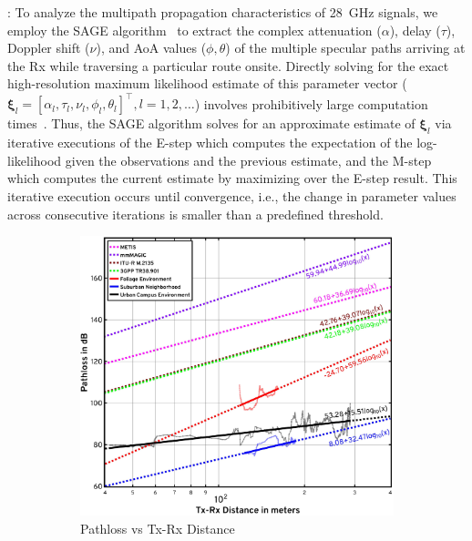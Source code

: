 \documentclass[12pt, draftcls, onecolumn]{IEEEtran}
\begin{document}
{: To analyze the multipath propagation characteristics of \SI{28}{\giga\hertz} signals, we employ the SAGE algorithm~\cite{SAGE} to extract the complex attenuation ($\alpha$), delay ($\tau$), Doppler shift ($\nu$), and AoA values ($\phi,\theta$) of the multiple specular paths arriving at the Rx while traversing a particular route onsite. Directly solving for the exact high-resolution maximum likelihood estimate of this parameter vector ($\boldsymbol{\xi}_{l}{=}[\alpha_{l},\tau_{l},\nu_{l},\phi_{l},\theta_{l}]^{\intercal},l{=}1,2,{\dots}$) involves prohibitively large computation times~\cite{SAGE}. Thus, the SAGE algorithm solves for an approximate estimate of $\boldsymbol{\xi}_{l}$ via iterative executions of the E-step which computes the expectation of the log-likelihood given the observations and the previous estimate, and the M-step which computes the current estimate by maximizing over the E-step result. This iterative execution occurs until convergence, i.e., the change in parameter values across consecutive iterations is smaller than a predefined threshold.
\begin{figure} [t]
    \centering
    \begin{subfigure}{0.498\linewidth}
        \centering
        \includegraphics[width=1.0\linewidth]{figs/pathloss_vs_distance.pdf}
        \caption{Pathloss vs Tx-Rx Distance}
        \label{F7a}
    \end{subfigure}
    \begin{subfigure}{0.492\linewidth}

\end{subfigure}
\end{figure}}
\end{document}

